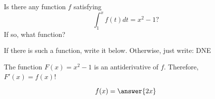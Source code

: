 \documentclass{ximera}
\author{Steven Gubkin}
\begin{document}
\begin{exercise}

Is there any function $f$ satisfying
\[
\int_1^x f(t) dt = x^2-1?
\]
If so, what function?

\begin{prompt}
  If there is such a function, write it below.  Otherwise, just write: DNE
  \begin{hint}
The function  $F(x)=x^2-1$ is an antiderivative of $f$.
  Therefore, $F'(x)=f(x)$!
    \end{hint}
  \[
  f(x) = \answer{2x}
  \]
\end{prompt}

\end{exercise}
\end{document}
